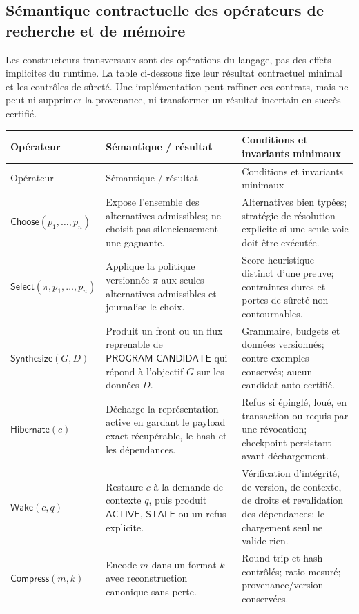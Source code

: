\subsection{Sémantique contractuelle des opérateurs de recherche et de mémoire}
Les constructeurs transversaux sont des opérations du langage, pas des effets implicites du runtime. La table ci-dessous fixe leur résultat contractuel minimal et les contrôles de sûreté. Une implémentation peut raffiner ces contrats, mais ne peut ni supprimer la provenance, ni transformer un résultat incertain en succès certifié.
\begin{longtable}{p{}p{}p{}}
\toprule Opérateur & Sémantique / résultat & Conditions et invariants minimaux \\
\midrule
\endfirsthead
\toprule Opérateur & Sémantique / résultat & Conditions et invariants minimaux \\
\midrule
\endhead
\(\mathsf{Choose}(p_1,\ldots,p_n)\) & Expose l'ensemble des alternatives admissibles; ne choisit pas silencieusement une gagnante. & Alternatives bien typées; stratégie de résolution explicite si une seule voie doit être exécutée. \\
\(\mathsf{Select}(\pi,p_1,\ldots,p_n)\) & Applique la politique versionnée \(\pi\) aux seules alternatives admissibles et journalise le choix. & Score heuristique distinct d'une preuve; contraintes dures et portes de sûreté non contournables. \\
\(\mathsf{Synthesize}(G,D)\) & Produit un front ou un flux reprenable de \(\mathsf{PROGRAM\mbox{-}CANDIDATE}\) qui répond à l'objectif \(G\) sur les données \(D\). & Grammaire, budgets et données versionnés; contre-exemples conservés; aucun candidat auto-certifié. \\
\(\mathsf{Hibernate}(c)\) & Décharge la représentation active en gardant le payload exact récupérable, le hash et les dépendances. & Refus si épinglé, loué, en transaction ou requis par une révocation; checkpoint persistant avant déchargement. \\
\(\mathsf{Wake}(c,q)\) & Restaure \(c\) à la demande de contexte \(q\), puis produit \(\mathsf{ACTIVE}\), \(\mathsf{STALE}\) ou un refus explicite. & Vérification d'intégrité, de version, de contexte, de droits et revalidation des dépendances; le chargement seul ne valide rien. \\
\(\mathsf{Compress}(m,k)\) & Encode \(m\) dans un format \(k\) avec reconstruction canonique sans perte. & Round-trip et hash contrôlés; ratio mesuré; provenance/version conservées. \\

\end{longtable}
